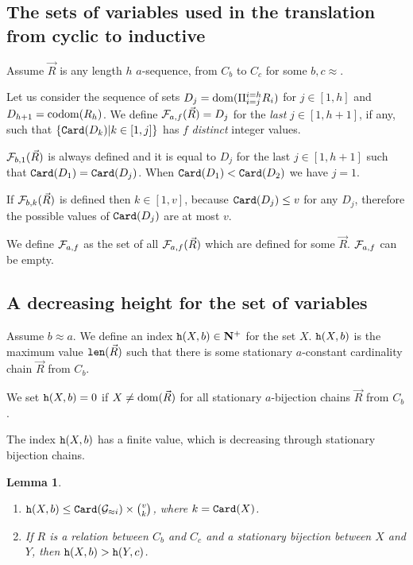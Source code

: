 \documentclass{lmcs}
\newtheorem{lemma}[theorem]{Lemma}
\begin{document}
\subsection{The sets of variables used in the translation from cyclic to inductive}
Assume $\vec{R}$ is any length $h$ $a$-sequence, from $C_b$ to $C_c$ 
for some $b,c \approx $.

Let us consider the sequence of sets $D_j = {\rm dom}(\Pi_{i=j}^{i=h} R_i)$
for $j \in [1,h]$ and $D_{h+1} = {\rm codom}(R_h)$. 
We define ${\mathcal F}_{a,f}(\vec{R}) = D_j$ 
for the \emph{last} $j \in [1,h+1]$, if any, such that
$\{{\tt Card}(D_k) | k \in [1,j]  \}$ has $f$ \emph{distinct} integer values. 

${\mathcal F}_{b,1}(\vec{R}) $ is always defined and it is equal to $D_j$
for the last $j \in [1,h+1]$ such that 
${\tt Card}(D_1) = {\tt Card}(D_j)$. When ${\tt Card}(D_1) < {\tt Card}(D_2)$ we have $j=1$.

If ${\mathcal F}_{b,k}(\vec{R})$ is defined then $k \in [1,v]$, because
${\tt Card}(D_j) \le v$ for any $D_j$,
therefore the possible values of ${\tt Card}(D_j)$ are at most $v$.

We define ${\mathcal F}_{a,f}$ as the set of all ${\mathcal F}_{a,f}(\vec{R})$ which are defined
for some $\vec{R}$. ${\mathcal F}_{a,f}$ can be empty.


\subsection{A decreasing height for the set of variables}
Assume $b \approx a$.
We define an index ${\tt h}(X,b) \in {\bf N}^+$ for the set $X$. 
${\tt h}(X,b)$ is the maximum value 
${\mbox{\tt len}}(\vec{R})$ such that there is some stationary 
$a$-constant cardinality chain $\vec{R}$ from $C_b$.

We set ${\tt h}(X,b)=0$ if $X \not = {\rm dom}(\vec {R})$ for all stationary $a$-bijection chains 
$\vec {R}$ from $C_b$.

The index ${\tt h}(X,b)$ has a finite value, which is decreasing through stationary bijection chains.


\begin{lemma} 
\begin{enumerate}
\item
$\height(X,b) \le \Card(\setG_{\approx i}) \times \newton{v}{k}$, where 
$k = {\tt Card}(X)$.
\item
If $R$ is a relation between $C_b$ and $C_c$ and a stationary bijection between
$X$ and $Y$, then ${\tt h}(X,b) > {\tt h}(Y,c)$. 
\end{enumerate}
\end{lemma}
\end{document}
